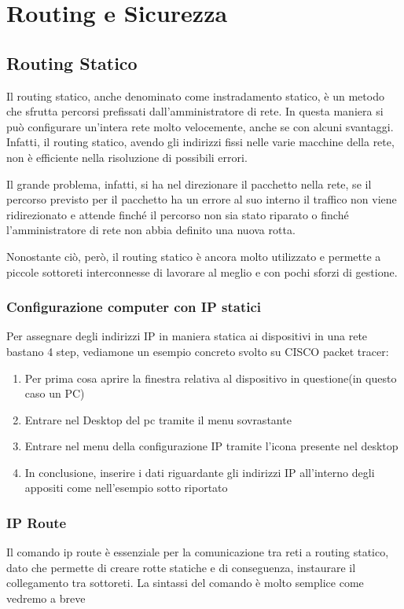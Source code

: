 \section{Routing e Sicurezza}
\subsection{Routing Statico}
Il routing statico, anche denominato come instradamento statico, è un metodo che sfrutta percorsi prefissati dall’amministratore di rete. In questa maniera si può configurare un'intera rete molto velocemente, anche se con alcuni svantaggi. Infatti, il routing statico, avendo gli indirizzi fissi nelle varie macchine della rete, non è efficiente nella risoluzione di possibili errori. 

Il grande problema, infatti, si ha nel direzionare il pacchetto nella rete, se il percorso previsto per il pacchetto ha un errore al suo interno il traffico non viene ridirezionato e attende finché il percorso non sia stato riparato o finché l'amministratore di rete non abbia definito una nuova rotta. 

Nonostante ciò, però, il routing statico è ancora molto utilizzato e permette a piccole sottoreti interconnesse di lavorare al meglio e con pochi sforzi di gestione.

\subsubsection*{Configurazione computer con IP statici}
Per assegnare degli indirizzi IP in maniera statica ai dispositivi in una rete bastano 4 step, vediamone un esempio concreto svolto su CISCO packet tracer:

\begin{enumerate}
    \item Per prima cosa aprire la finestra relativa al dispositivo in questione(in questo caso un PC)
    \item Entrare nel Desktop del pc tramite il menu sovrastante
    \item Entrare nel menu della configurazione IP tramite l’icona presente nel desktop
    \item In conclusione, inserire i dati riguardante gli indirizzi IP all’interno degli appositi come nell’esempio sotto riportato
\end{enumerate}

\subsubsection*{IP Route}
Il comando ip route è essenziale per la comunicazione tra reti a routing statico, dato che permette di creare rotte statiche e di conseguenza, instaurare il collegamento tra sottoreti. La sintassi del comando è molto semplice come vedremo a breve


